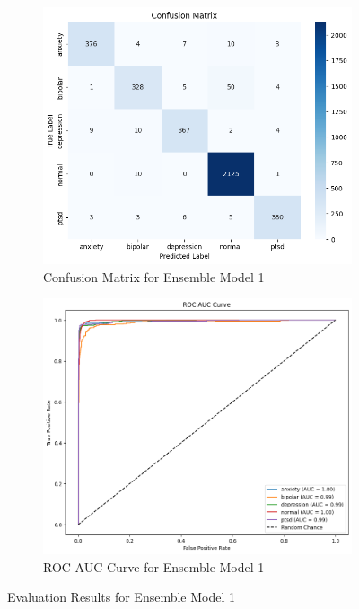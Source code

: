 \begin{figure}[h!]
    \centering
    \begin{subfigure}[b]{0.49\textwidth}
        \centering
        \includegraphics[width=\textwidth]{Images/EM CM.png}
        \caption{Confusion Matrix for Ensemble Model 1}
        \label{dfdl3123}  %
    \end{subfigure}
    \hfill
    \begin{subfigure}[b]{0.49\textwidth}
        \centering
        \includegraphics[width=\textwidth]{Images/EM ROC.png}
        \caption{ROC AUC Curve for Ensemble Model 1}
        \label{dfdl12443}  %
    \end{subfigure}
    \caption{Evaluation Results for Ensemble Model 1}
    \label{fig:ensemble_model_comparison}
\end{figure}

